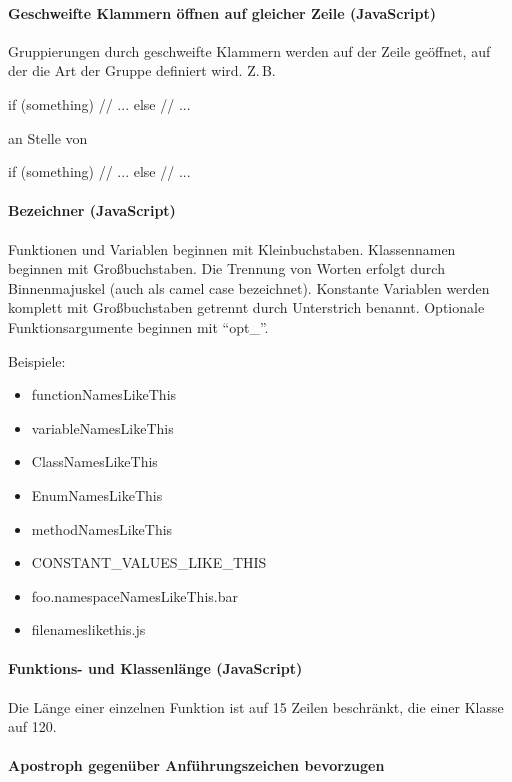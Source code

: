 \paragraph{Geschweifte Klammern öffnen auf gleicher Zeile (JavaScript)}

Gruppierungen durch geschweifte Klammern werden auf der Zeile
geöffnet, auf der die Art der Gruppe definiert wird.
Z.\,B.

if (something) {
  // ...
} else {
  // ...
}

an Stelle von

if (something) 
{
  // ...
} else 
{
  // ...
}

\paragraph{Bezeichner (JavaScript)}

Funktionen und Variablen beginnen mit Kleinbuchstaben.
Klassennamen beginnen mit Großbuchstaben.
Die Trennung von Worten erfolgt durch Binnenmajuskel (auch als camel
case bezeichnet).
Konstante Variablen werden komplett mit Großbuchstaben getrennt durch
Unterstrich benannt.
Optionale Funktionsargumente beginnen mit ``opt\_''.

Beispiele:
\begin{itemize}
\item functionNamesLikeThis
\item variableNamesLikeThis
\item ClassNamesLikeThis
\item EnumNamesLikeThis
\item methodNamesLikeThis
\item CONSTANT\_VALUES\_LIKE\_THIS
\item foo.namespaceNamesLikeThis.bar
\item filenameslikethis.js
\end{itemize}

\paragraph{Funktions- und Klassenlänge (JavaScript)}

Die Länge einer einzelnen Funktion ist auf 15 Zeilen beschränkt, die
einer Klasse auf 120.

\paragraph{Apostroph gegenüber Anführungszeichen bevorzugen}

